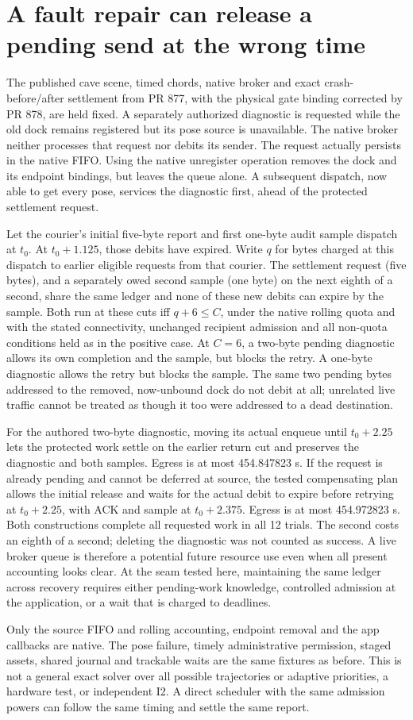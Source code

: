 \documentclass{article}
\begin{document}
\section*{A fault repair can release a pending send at the wrong time}
The published cave scene, timed chords, native broker and exact
crash-before/after settlement from PR 877, with the physical gate binding corrected by PR 878, are held fixed.
A separately authorized diagnostic is requested while the old dock
remains registered but its pose source is unavailable. The native broker
neither processes that request nor debits its sender. The request actually
persists in the native FIFO. Using the native unregister operation removes
the dock and its endpoint bindings, but leaves the queue alone.
A subsequent dispatch, now able to get every pose, services the diagnostic
first, ahead of the protected settlement request.

Let the courier's initial five-byte report and first one-byte audit
sample dispatch at $t_0$. At $t_0+1.125$, those debits have expired.
Write $q$ for bytes charged at this dispatch to earlier eligible requests
from that courier. The settlement request (five bytes), and a separately
owed second sample (one byte) on the next eighth of a second, share the
same ledger and none of these new debits can expire by the sample.
Both run at these cuts iff $q+6\le C$, under the native rolling quota
and with the stated connectivity, unchanged recipient admission and
all non-quota conditions held as in the positive case. At $C=6$, a
two-byte pending diagnostic allows its own completion and the sample,
but blocks the retry. A one-byte diagnostic allows the retry but blocks
the sample. The same two pending bytes addressed to the removed,
now-unbound dock do not debit at all; unrelated live traffic cannot be
treated as though it too were addressed to a dead destination.

For the authored two-byte diagnostic, moving its actual enqueue until
$t_0+2.25$ lets the protected work settle on the earlier return cut
and preserves the diagnostic and both samples. Egress is at most
454.847823 s. If the request is already pending and cannot be deferred
at source, the tested compensating plan allows the initial release and
waits for the actual debit to expire before retrying at $t_0+2.25$,
with ACK and sample at $t_0+2.375$. Egress is at most 454.972823 s.
Both constructions complete all requested work in all 12 trials.
The second costs an eighth of a second; deleting the diagnostic was
not counted as success. A live broker queue is therefore a potential
future resource use even when all present accounting looks clear.
At the seam tested here, maintaining the same ledger across recovery
requires either pending-work knowledge, controlled admission at the
application, or a wait that is charged to deadlines.

Only the source FIFO and rolling accounting, endpoint removal and
the app callbacks are native. The pose failure, timely administrative
permission, staged assets, shared journal and trackable waits are the
same fixtures as before. This is not a general exact solver over all
possible trajectories or adaptive priorities, a hardware test, or
independent I2. A direct scheduler with the same admission powers can
follow the same timing and settle the same report.
\end{document}
